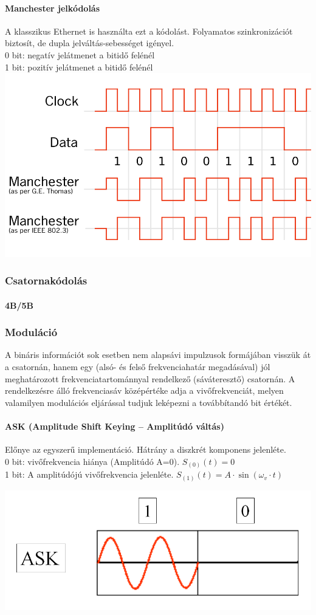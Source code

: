 \paragraph{Manchester jelkódolás} A klasszikus Ethernet is használta ezt a kódolást. Folyamatos szinkronizációt biztosít, de dupla jelváltás-sebességet igényel.\\
0 bit: negatív jelátmenet a bitidő felénél\\
1 bit: pozitív jelátmenet a bitidő felénél\\
\includegraphics[width=0.35\linewidth]{fig/12_Manchester}

\subsubsection{Csatornakódolás}

\paragraph{4B/5B}

\subsubsection{Moduláció}
A bináris információt sok esetben nem alapsávi impulzusok formájában visszük át a csatornán, hanem egy (alsó- és felső frekvenciahatár megadásával) jól meghatározott frekvenciatartománnyal rendelkező (sáváteresztő) csatornán. A rendelkezésre álló frekvenciasáv középértéke adja a vivőfrekvenciát, melyen valamilyen modulációs eljárással tudjuk leképezni a továbbítandó bit értékét.

\paragraph{ASK (Amplitude Shift Keying -- Amplitúdó váltás)} Előnye az egyszerű implementáció. Hátrány a diszkrét komponens jelenléte.\\
0 bit: vivőfrekvencia hiánya (Amplitúdó A=0). $S_{(0)}(t) = 0$\\
1 bit: A amplitúdójú vivőfrekvencia jelenléte. $S_{(1)}(t) = A\cdot\sin(\omega_v\cdot t) $\\
\begin{center}
	\includegraphics[width=0.25\linewidth]{fig/12-ASK}
\end{center}

